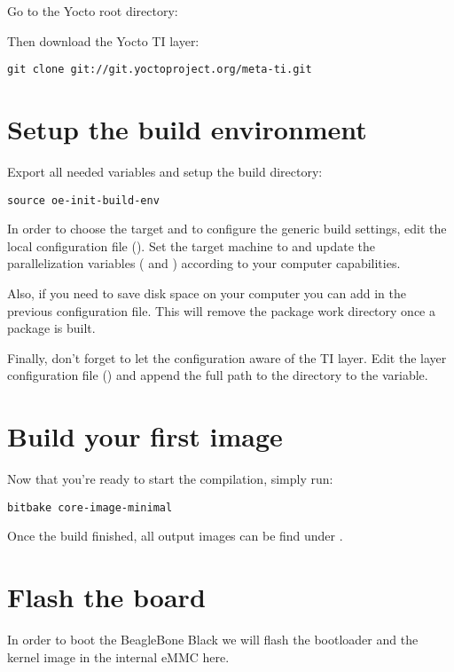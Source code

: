 Go to the Yocto root directory: 

Then download the Yocto TI layer:
\begin{verbatim}
git clone git://git.yoctoproject.org/meta-ti.git
\end{verbatim}

\section{Setup the build environment}

Export all needed variables and setup the build directory:
\begin{verbatim}
source oe-init-build-env
\end{verbatim}

In order to choose the target and to configure the generic build settings,
edit the local configuration file (). Set
the target machine to  and update the parallelization variables
( and ) according to your computer
capabilities.

Also, if you need to save disk space on your computer you can add  in the previous configuration file. This will remove the
package work directory once a package is built.

Finally, don't forget to let the configuration aware of the TI layer. Edit the
layer configuration file () and append the
full path to the  directory to the  variable.

\section{Build your first image}

Now that you're ready to start the compilation, simply run:
\begin{verbatim}
bitbake core-image-minimal
\end{verbatim}

Once the build finished, all output images can be find under
.

\section{Flash the board}

In order to boot the BeagleBone Black we will flash the bootloader and the
kernel image in the internal eMMC here.

